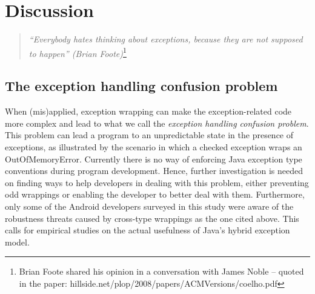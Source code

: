 \section{Discussion}
\label{sec:disc}

\begin{quotation}
\noindent
 \emph{``Everybody hates thinking about exceptions, because they are not supposed to happen'' 
  (Brian Foote)}\footnote{Brian Foote shared his opinion in a conversation with James Noble -- quoted in the paper: hillside.net/plop/2008/papers/ACMVersions/coelho.pdf}
\end{quotation}


\subsection{The exception handling confusion problem}
When (mis)applied, exception wrapping can make the exception-related code
 more complex and lead to what we call the \emph{exception handling confusion problem}.
This problem can lead a program to an unpredictable state in the presence of exceptions,
as illustrated by the scenario in which a checked exception wraps an OutOfMemoryError. 
Currently there is no way of enforcing Java exception type conventions during program development.
Hence, further investigation is needed on finding ways to help developers in dealing with this
 problem, either preventing odd wrappings or enabling the developer to
 better deal with them.
Furthermore, only some of the Android developers surveyed in this study were aware of the 
robustness threats caused by cross-type wrappings as the one cited above. This calls for empirical studies on the actual usefulness of Java's hybrid exception model. 


